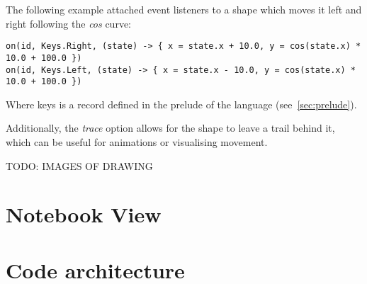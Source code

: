The following example attached event listeners to a shape which moves it left and right following the \textit{cos} curve:

\begin{verbatim}
on(id, Keys.Right, (state) -> { x = state.x + 10.0, y = cos(state.x) * 10.0 + 100.0 })
on(id, Keys.Left, (state) -> { x = state.x - 10.0, y = cos(state.x) * 10.0 + 100.0 })
\end{verbatim}

Where keys is a record defined in the prelude of the language (see~\autoref{sec:prelude}).

Additionally, the \textit{trace} option allows for the shape to leave a trail behind it, which can be useful for
animations or visualising movement.

TODO: IMAGES OF DRAWING

\section{Notebook View}\label{sec:notebook-view}

\section{Code architecture}\label{sec:code-architecture}
